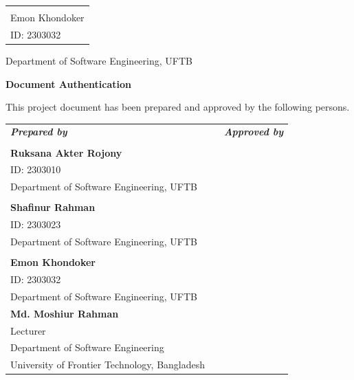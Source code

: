 \documentclass[12pt,a4paper]{article}
\begin{document}
\vspace{0.6cm}
\begin{tabular}{p{5cm}}
\underline{\hspace{4.5cm}} \\
Emon Khondoker \\
ID: 2303032 \\
\end{tabular}

\vspace{0.3cm}
Department of Software Engineering, UFTB
\newpage

\thispagestyle{plain}
\begin{center}{\large\bfseries\color{navyblue} Document Authentication}\end{center}
\vspace{0.5em}

This project document has been prepared and approved by the following persons.

\vspace{1.5cm}

\begin{center}
\begin{tabular}{p{6.5cm} p{1.5cm} p{6.5cm}}

\textit{\textbf{Prepared by}} & & \textit{\textbf{Approved by}} \\[0.6cm]

\begin{minipage}[t]{6.5cm}
    \underline{\hspace{5.5cm}} \\[5pt]
    \textbf{Ruksana Akter Rojony} \\
    ID: 2303010 \\
    Department of Software Engineering, UFTB \\[1.5cm]

    \underline{\hspace{5.5cm}} \\[5pt]
    \textbf{Shafinur Rahman} \\
    ID: 2303023 \\
    Department of Software Engineering, UFTB \\[1.5cm]

    \underline{\hspace{5.5cm}} \\[5pt]
    \textbf{Emon Khondoker} \\
    ID: 2303032 \\
    Department of Software Engineering, UFTB
\end{minipage} 
& & 
\begin{minipage}[t]{6.5cm}
    \underline{\hspace{5.5cm}} \\[5pt]
    \textbf{Md. Moshiur Rahman} \\
    Lecturer \\
    Department of Software Engineering \\
    University of Frontier Technology, Bangladesh
\end{minipage}

\end{tabular}
\end{center}
\newpage
\end{document}
